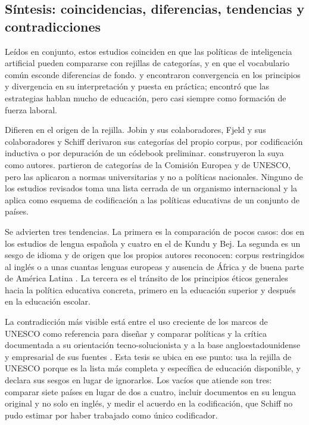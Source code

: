\subsection{Síntesis: coincidencias, diferencias, tendencias y contradicciones}
\label{subsec:ea-sintesis}

Leídos en conjunto, estos estudios coinciden en que las políticas de inteligencia
artificial pueden compararse con rejillas de categorías, y en que el vocabulario común
esconde diferencias de fondo. \citet{jobin2019landscape} y \citet{fjeld2020principled}
encontraron convergencia en los principios y divergencia en su interpretación y puesta en
práctica; \citet{schiff2022education} encontró que las estrategias hablan mucho de
educación, pero casi siempre como formación de fuerza laboral.

Difieren en el origen de la rejilla. Jobin y sus colaboradores, Fjeld y sus colaboradores y
Schiff derivaron sus categorías del propio corpus, por codificación inductiva o por
depuración de un códebook preliminar. \citet{kundu2025aipolicies} construyeron la suya
como autores. \citet{martinezrojas2026regulacion} partieron de categorías de la Comisión
Europea y de UNESCO, pero las aplicaron a normas universitarias y no a políticas
nacionales. Ninguno de los estudios revisados toma una lista cerrada de un organismo
internacional y la aplica como esquema de codificación a las políticas educativas de un
conjunto de países.

Se advierten tres tendencias. La primera es la comparación de pocos casos: dos en los
estudios de lengua española y cuatro en el de Kundu y Bej. La segunda es un sesgo de idioma
y de origen que los propios autores reconocen: corpus restringidos al inglés o a unas
cuantas lenguas europeas y ausencia de África y de buena parte de América Latina
\citep{jobin2019landscape, fjeld2020principled, schiff2022education}. La tercera es el
tránsito de los principios éticos generales hacia la política educativa concreta, primero
en la educación superior y después en la educación escolar.

La contradicción más visible está entre el uso creciente de los marcos de UNESCO como
referencia para diseñar y comparar políticas y la crítica documentada a su orientación
tecno-solucionista y a la base angloestadounidense y empresarial de sus fuentes
\citep{mochizuki2025ethics}. Esta tesis se ubica en ese punto: usa la rejilla de UNESCO
porque es la lista más completa y específica de educación disponible, y declara sus sesgos
en lugar de ignorarlos. Los vacíos que atiende son tres: comparar siete países en lugar de
dos a cuatro, incluir documentos en su lengua original y no solo en inglés, y medir el
acuerdo en la codificación, que Schiff no pudo estimar por haber trabajado como único
codificador.

